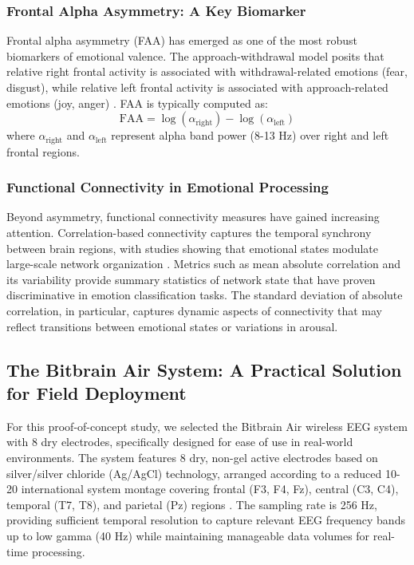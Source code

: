\subsubsection{Frontal Alpha Asymmetry: A Key Biomarker}

Frontal alpha asymmetry (FAA) has emerged as one of the most robust biomarkers of emotional valence. The approach-withdrawal model posits that relative right frontal activity is associated with withdrawal-related emotions (fear, disgust), while relative left frontal activity is associated with approach-related emotions (joy, anger) \cite{coan2006frontal}. FAA is typically computed as:
\begin{equation}
\text{FAA} = \log(\alpha_{\text{right}}) - \log(\alpha_{\text{left}})
\end{equation}
where $\alpha_{\text{right}}$ and $\alpha_{\text{left}}$ represent alpha band power (8-13 Hz) over right and left frontal regions.

\subsubsection{Functional Connectivity in Emotional Processing}

Beyond asymmetry, functional connectivity measures have gained increasing attention. Correlation-based connectivity captures the temporal synchrony between brain regions, with studies showing that emotional states modulate large-scale network organization \cite{liu2024graph_eeg_emotion}. Metrics such as mean absolute correlation and its variability provide summary statistics of network state that have proven discriminative in emotion classification tasks. The standard deviation of absolute correlation, in particular, captures dynamic aspects of connectivity that may reflect transitions between emotional states or variations in arousal.

\subsection{The Bitbrain Air System: A Practical Solution for Field Deployment}

For this proof-of-concept study, we selected the Bitbrain Air wireless EEG system with 8 dry electrodes, specifically designed for ease of use in real-world environments. The system features 8 dry, non-gel active electrodes based on silver/silver chloride (Ag/AgCl) technology, arranged according to a reduced 10-20 international system montage covering frontal (F3, F4, Fz), central (C3, C4), temporal (T7, T8), and parietal (Pz) regions \cite{bitbrain2024}. The sampling rate is 256 Hz, providing sufficient temporal resolution to capture relevant EEG frequency bands up to low gamma (40 Hz) while maintaining manageable data volumes for real-time processing.

